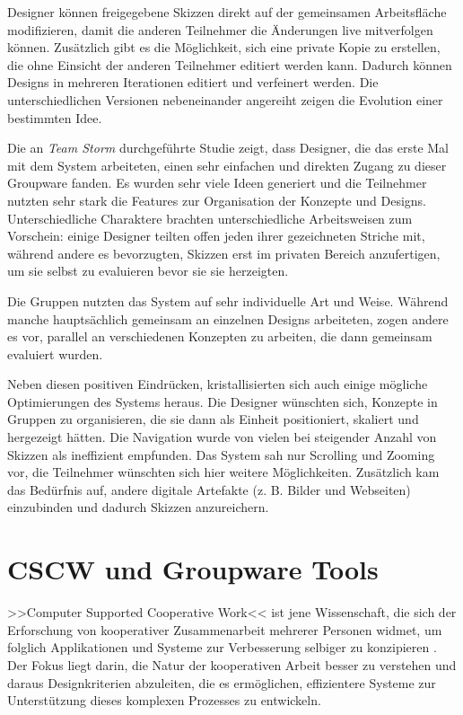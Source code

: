Designer können freigegebene Skizzen direkt auf der gemeinsamen Arbeitsfläche modifizieren, damit die anderen Teilnehmer die Änderungen live mitverfolgen können. Zusätzlich gibt es die Möglichkeit, sich eine private Kopie zu erstellen, die ohne Einsicht der anderen Teilnehmer editiert werden kann. Dadurch können Designs in mehreren Iterationen editiert und verfeinert werden. Die unterschiedlichen Versionen nebeneinander angereiht zeigen die Evolution einer bestimmten Idee.

Die an \emph{Team Storm} durchgeführte Studie \citep{Hailpern:2007p113} zeigt, dass Designer, die das erste Mal mit dem System arbeiteten, einen sehr einfachen und direkten Zugang zu dieser Groupware fanden. Es wurden sehr viele Ideen generiert und die Teilnehmer nutzten sehr stark die Features zur Organisation der Konzepte und Designs. Unterschiedliche Charaktere brachten unterschiedliche Arbeitsweisen zum Vorschein: einige Designer teilten offen jeden ihrer gezeichneten Striche mit, während andere es bevorzugten, Skizzen erst im privaten Bereich anzufertigen, um sie selbst zu evaluieren bevor sie sie herzeigten.

Die Gruppen nutzten das System auf sehr individuelle Art und Weise. Während manche hauptsächlich gemeinsam an einzelnen Designs arbeiteten, zogen andere es vor, parallel an verschiedenen Konzepten zu arbeiten, die dann gemeinsam evaluiert wurden.

Neben diesen positiven Eindrücken, kristallisierten sich auch einige mögliche Optimierungen des Systems heraus. Die Designer wünschten sich, Konzepte in Gruppen zu organisieren, die sie dann als Einheit positioniert, skaliert und hergezeigt hätten. Die Navigation wurde von vielen bei steigender Anzahl von Skizzen als ineffizient empfunden. Das System sah nur Scrolling und Zooming vor, die Teilnehmer wünschten sich hier weitere Möglichkeiten. Zusätzlich kam das Bedürfnis auf, andere digitale Artefakte (z. B. Bilder und Webseiten) einzubinden und dadurch Skizzen anzureichern.

\section{CSCW und Groupware Tools} \label{sec:groupWareTools}
>>Computer Supported Cooperative Work<< ist jene Wissenschaft, die sich der Erforschung von kooperativer Zusammenarbeit mehrerer Personen widmet, um folglich Applikationen und Systeme zur Verbesserung selbiger zu konzipieren \citep{Bannon:1990p244}. Der Fokus liegt darin, die Natur der kooperativen Arbeit besser zu verstehen und daraus Designkriterien abzuleiten, die es ermöglichen, effizientere Systeme zur Unterstützung dieses komplexen Prozesses zu entwickeln. 

